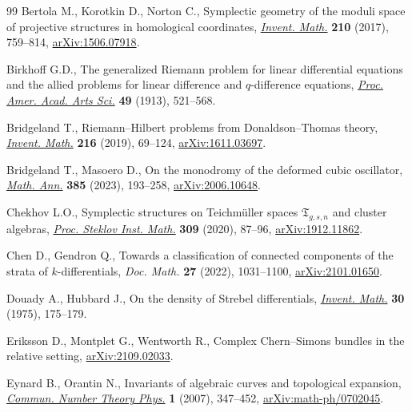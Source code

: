 \documentclass[pdftex]{sigma}
\numberwithin{equation}{section}
\theoremstyle{definition}
\begin{document}
\begin{thebibliography}{99}
Bertola M., Korotkin D., Norton C., Symplectic geometry of the moduli space of
 projective structures in homological coordinates, \href{https://doi.org/10.1007/s00222-017-0739-z}{\textit{Invent. Math.}}
 \textbf{210} (2017), 759--814, \href{https://arxiv.org/abs/1506.07918}{arXiv:1506.07918}.

Birkhoff G.D., The generalized Riemann problem for linear differential
 equations and the allied problems for linear difference and $q$-difference
 equations, \href{https://doi.org/10.2307/20025482}{\textit{Proc. Amer. Acad. Arts Sci.}} \textbf{49} (1913), 521--568.

Bridgeland T., Riemann--{H}ilbert problems from {D}onaldson--{T}homas theory,
 \href{https://doi.org/10.1007/s00222-018-0843-8}{\textit{Invent. Math.}} \textbf{216} (2019), 69--124, \href{https://arxiv.org/abs/1611.03697}{arXiv:1611.03697}.

Bridgeland T., Masoero D., On the monodromy of the deformed cubic oscillator,
 \href{https://doi.org/10.1007/s00208-021-02337-w}{\textit{Math. Ann.}} \textbf{385} (2023), 193--258, \href{https://arxiv.org/abs/2006.10648}{arXiv:2006.10648}.

Chekhov L.O., Symplectic structures on {T}eichm\"uller spaces {$
 \mathfrak{T}_{g,s,n}$} and cluster algebras, \href{https://doi.org/10.1134/S0081543820030074}{\textit{Proc. Steklov Inst.
 Math.}} \textbf{309} (2020), 87--96, \href{https://arxiv.org/abs/1912.11862}{arXiv:1912.11862}.

Chen D., Gendron Q., Towards a classification of connected components of the
 strata of {$k$}-differentials, \textit{Doc. Math.} \textbf{27} (2022),
 1031--1100, \href{https://arxiv.org/abs/2101.01650}{arXiv:2101.01650}.

Douady A., Hubbard J., On the density of {S}trebel differentials,
 \href{https://doi.org/10.1007/BF01425507}{\textit{Invent. Math.}} \textbf{30} (1975), 175--179.

Eriksson D., Montplet G., Wentworth R., Complex {C}hern--{S}imons bundles in
 the relative setting, \href{https://arxiv.org/abs/2109.02033}{arXiv:2109.02033}.

Eynard B., Orantin N., Invariants of algebraic curves and topological
 expansion, \href{https://doi.org/10.4310/CNTP.2007.v1.n2.a4}{\textit{Commun. Number Theory Phys.}} \textbf{1} (2007), 347--452,
 \href{https://arxiv.org/abs/math-ph/0702045}{arXiv:math-ph/0702045}.


\end{thebibliography}
\end{document}
